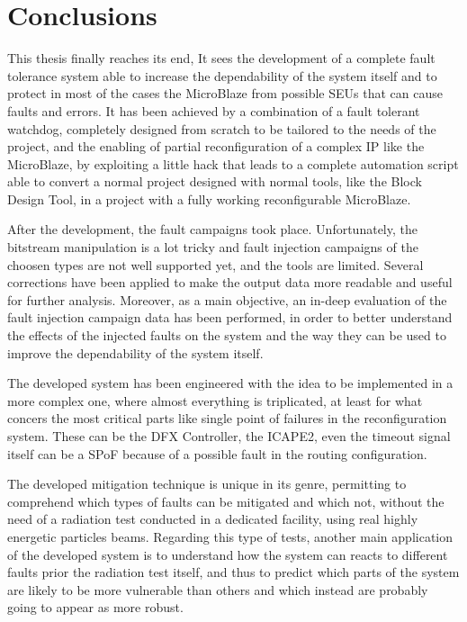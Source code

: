 \chapter{Conclusions}
\label{sec:concl}

This thesis finally reaches its end, It sees the development of a complete fault tolerance system able to increase the dependability of the system itself and to protect in most of the cases the MicroBlaze from possible SEUs that can cause faults and errors. It has been achieved by a combination of a fault tolerant watchdog, completely designed from scratch to be tailored to the needs of the project, and the enabling of partial reconfiguration of a complex IP like the MicroBlaze, by exploiting a little hack that leads to a complete automation script able to convert a normal project designed with normal tools, like the Block Design Tool, in a project with a fully working reconfigurable MicroBlaze.\bigskip

After the development, the fault campaigns took place. Unfortunately, the bitstream manipulation is a lot tricky and fault injection campaigns of the choosen types are not well supported yet, and the tools are limited. Several corrections have been applied to
make the output data more readable and useful for further analysis. Moreover, as a main objective, an in-deep evaluation of the fault injection campaign data has been performed, in order to better understand the effects of the injected faults on the system
and the way they can be used to improve the dependability of the system itself.\bigskip

The developed system has been engineered with the idea to be implemented in a more complex one, where almost everything is triplicated, at least for what concers the most critical parts like single point of failures in the reconfiguration system. These can be the DFX Controller, the ICAPE2, even the timeout signal itself can be a SPoF because of a possible fault in the routing configuration. \bigskip

The developed mitigation technique is unique in its genre, permitting to comprehend which types of faults can be mitigated and which not, without the need of a radiation test conducted in a dedicated facility, using real highly energetic particles beams. Regarding this type of tests, another main application of the developed system is to understand how the system can reacts to different faults prior the radiation test itself, and thus to predict which parts of the system are likely to be more vulnerable than others and which instead are probably going to appear as more robust.  

